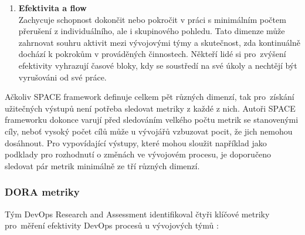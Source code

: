 \begin{enumerate}
    Nedílnou součástí vývoje softwaru je i komunikace a spolupráce s ostatními členy týmu a dalšími stranami. Pro efektivní spolupráci členů týmu je důležitá transparentnost a vzájemný přehled o prováděných činnostech. Ačkoliv nutnost komunikace s dalšími členy týmu může v daný okamžik ovlivnit produktivitu jednotlivce, tak v celkovém měřítku má efektivní spolupráce pozitivní vliv na rychlost odbavování pull requestů, kvalitu kódu a produktivitu týmu jako celku.
    \item \textbf{Efektivita a flow}\\
    Zachycuje schopnost dokončit nebo pokročit v práci s minimálním počtem přerušení z individuálního, ale i skupinového pohledu. Tato dimenze může zahrnovat souhru aktivit mezi vývojovými týmy a skutečnost, zda kontinuálně dochází k pokrokům v prováděných činnostech. Někteří lidé si pro~zvýšení efektivity vyhrazují časové bloky, kdy se soustředí na své úkoly a nechtějí být vyrušováni od své práce.
\end{enumerate}


Ačkoliv SPACE framework definuje celkem pět různých dimenzí, tak pro~získání užitečných výstupů není potřeba sledovat metriky z každé z nich. Autoři SPACE frameworku dokonce varují před sledováním velkého počtu metrik se stanovenými cíly, neboť vysoký počet cílů může u vývojářů vzbuzovat pocit, že jich nemohou dosáhnout. Pro vypovídající výstupy, které mohou sloužit například jako podklady pro rozhodnutí o změnách ve vývojovém procesu, je doporučeno sledovat pár metrik minimálně ze tří různých dimenzí.

\newpage
\subsubsection{DORA metriky}\label{section:dora}
Tým DevOps Research and Assessment identifikoval čtyři klíčové metriky pro~měření efektivity DevOps procesů u vývojových týmů \cite{DORA-metrics, DORA-metrics-framework}:

